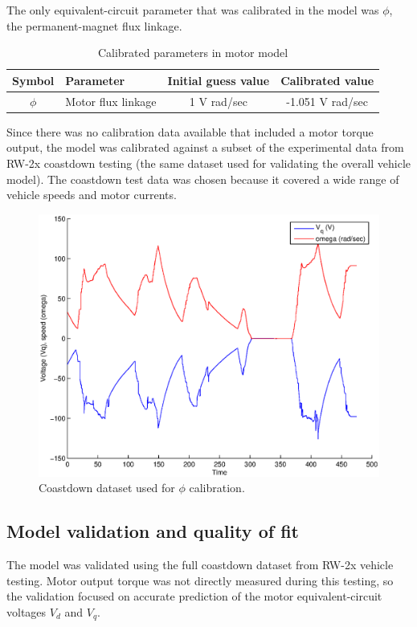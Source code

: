 \documentclass[../SimBALink.tex]{subfiles}
\begin{document}
			The only equivalent-circuit parameter that was calibrated in the model was $\phi$, the permanent-magnet flux linkage.
						
			\begin{table}
				\centering
				\caption{Calibrated parameters in motor model}
				\label{table:motor_calibrated_parameters}
				\begin{tabular}{c | l | c | c}
					Symbol		&	Parameter			&	Initial guess value	&	Calibrated value	\\
					\hline
					$\phi$		&	Motor flux linkage		&	1 V rad/sec	 	&	-1.051 V rad/sec
				\end{tabular}
			\end{table}
			
			Since there was no calibration data available that included a motor torque output, the model was calibrated against a subset of the experimental data from RW-2x coastdown testing (the same dataset used for validating the overall vehicle model). The coastdown test data was chosen because it covered a wide range of vehicle speeds and motor currents.
			
			\begin{figure}[h]
				\centering
				\includegraphics[width=5in]{../Model/Powertrain/Motor/Validation/EMRAX_228HV/Figures/228HV_coastdown_calibration_data}
				\caption{Coastdown dataset used for $\phi$ calibration.}
			\end{figure}
			\FloatBarrier
			
	\subsection{Model validation and quality of fit}
		The model was validated using the full coastdown dataset from RW-2x vehicle testing. Motor output torque was not directly measured during this testing, so the validation focused on accurate prediction of the motor equivalent-circuit voltages $V_d$ and $V_q$. 
		
\end{document}
